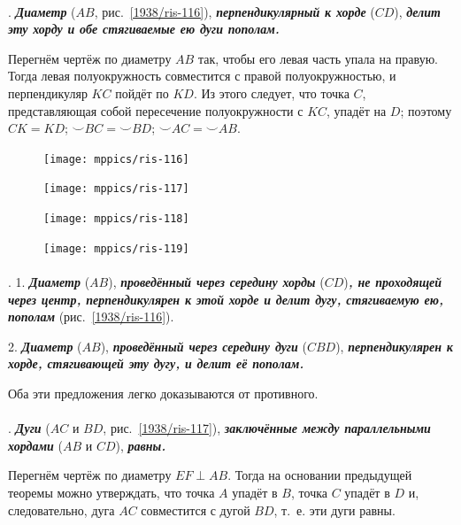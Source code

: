 \documentclass[oneside]{book}
\begin{document}
\paragraph{}\label{1938/105}
\mbox{.}
\textbf{\emph{Диаметр}} ($AB$, рис.~\ref{1938/ris-116}), \textbf{\emph{перпендикулярный к хорде}} ($CD$), \textbf{\emph{делит эту хорду и обе стягиваемые ею дуги пополам.}}

Перегнём чертёж по диаметру $AB$ так, чтобы его левая часть упала на правую.
Тогда левая полуокружность совместится с правой полуокружностью, и перпендикуляр $KC$ пойдёт по $KD$.
Из этого следует, что точка $C$, представляющая собой пересечение полуокружности с $KC$, упадёт на $D$;
поэтому $CK=KD$;
${\smallsmile} BC={\smallsmile} BD$;
${\smallsmile} AC={\smallsmile} AB$.

\begin{figure}
\vskip-11mm
\centering
\texttt{[image: mppics/ris-116]}
\caption{}\label{1938/ris-116}
\bigskip
\texttt{[image: mppics/ris-117]}
\caption{}\label{1938/ris-117}
\bigskip
\texttt{[image: mppics/ris-118]}
\caption{}\label{1938/ris-118}
\bigskip
\texttt{[image: mppics/ris-119]}
\caption{}\label{1938/ris-119}
\end{figure}

\paragraph{}\label{1938/106}
\mbox{.}
1.
\textbf{\emph{Диаметр}} ($AB$), \textbf{\emph{проведённый через середину хорды}} ($CD$)\textbf{\emph{, не проходящей через центр, перпендикулярен к этой хорде и делит дугу, стягиваемую ею, пополам}} (рис.~\ref{1938/ris-116}).


2.
\textbf{\emph{Диаметр}} ($AB$), \textbf{\emph{проведённый через середину дуги}} ($CBD$), \textbf{\emph{перпендикулярен к хорде, стягивающей эту дугу, и делит её пополам.}}

Оба эти предложения легко доказываются от противного.


\paragraph{}\label{1938/107}
\mbox{.}
\textbf{\emph{Дуги}} ($AC$ и $BD$, рис.~\ref{1938/ris-117}), \textbf{\emph{заключённые между параллельными хордами}} ($AB$ и $CD$), \textbf{\emph{равны.}}

Перегнём чертёж по диаметру $EF\perp AB$.
Тогда на основании предыдущей теоремы можно утверждать, что точка $A$ упадёт в $B$, точка $C$ упадёт в $D$ и, следовательно, дуга $AC$ совместится с дугой $BD$, т.~е. эти дуги равны.
\end{document}

